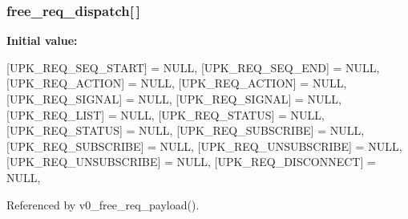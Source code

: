\subsubsection[{free\_\-req\_\-dispatch}]{ {\bf free\_\-req\_\-dispatch}[$\,$]\hspace{0.3cm}{\ttfamily  [static]}}\label{upk__v0__protocol_8c_adf63201067ce0b80294fe667e57cb8b0}
{\bfseries Initial value:}
\begin{DoxyCode}
 {
    [UPK_REQ_SEQ_START] = NULL,
    [UPK_REQ_SEQ_END] = NULL,
    [UPK_REQ_ACTION] = NULL,
    [UPK_REQ_ACTION] = NULL,
    [UPK_REQ_SIGNAL] = NULL,
    [UPK_REQ_SIGNAL] = NULL,
    [UPK_REQ_LIST] = NULL,
    [UPK_REQ_STATUS] = NULL,
    [UPK_REQ_STATUS] = NULL,
    [UPK_REQ_SUBSCRIBE] = NULL,
    [UPK_REQ_SUBSCRIBE] = NULL,
    [UPK_REQ_UNSUBSCRIBE] = NULL,
    [UPK_REQ_UNSUBSCRIBE] = NULL,
    [UPK_REQ_DISCONNECT] = NULL,
}
\end{DoxyCode}


Referenced by v0\_\-free\_\-req\_\-payload().

